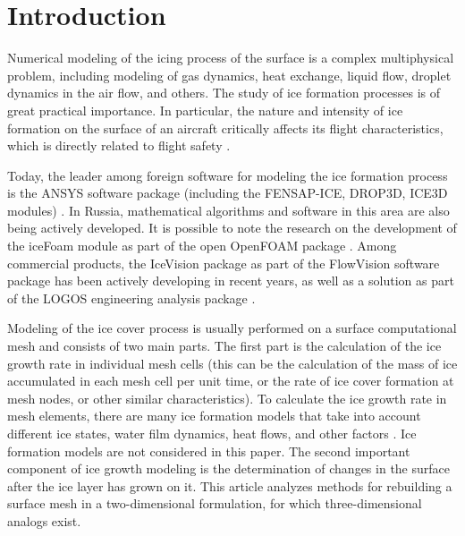 \documentclass[
11pt,%
tightenlines,%
twoside,%
onecolumn,%
nofloats,%
nobibnotes,%
nofootinbib,%
superscriptaddress,%
noshowpacs,%
centertags]%
{revtex4}
\begin{document}


\maketitle



\section{Introduction}

Numerical modeling of the icing process of the surface is a complex multiphysical problem, including modeling of gas dynamics, heat exchange, liquid flow, droplet dynamics in the air flow, and others.
The study of ice formation processes is of great practical importance.
In particular, the nature and intensity of ice formation on the surface of an aircraft critically affects its flight characteristics, which is directly related to flight safety \cite{Raj}.

Today, the leader among foreign software for modeling the ice formation process is the ANSYS software package (including the FENSAP-ICE, DROP3D, ICE3D modules) \cite{Martini}.
In Russia, mathematical algorithms and software in this area are also being actively developed.
It is possible to note the research on the development of the iceFoam module as part of the open OpenFOAM package \cite{Koshelev}.
Among commercial products, the IceVision package as part of the FlowVision software package \cite{Sorokin} has been actively developing in recent years, as well as a solution as part of the LOGOS engineering analysis package \cite{Galanov}.

Modeling of the ice cover process is usually performed on a surface computational mesh and consists of two main parts.
The first part is the calculation of the ice growth rate in individual mesh cells (this can be the calculation of the mass of ice accumulated in each mesh cell per unit time, or the rate of ice cover formation at mesh nodes, or other similar characteristics).
To calculate the ice growth rate in mesh elements, there are many ice formation models that take into account different ice states, water film dynamics, heat flows, and other factors \cite{Bartkus,Zhang,Pena}.
Ice formation models are not considered in this paper.
The second important component of ice growth modeling is the determination of changes in the surface after the ice layer has grown on it.
This article analyzes methods for rebuilding a surface mesh in a two-dimensional formulation, for which three-dimensional analogs exist.
\end{document}
